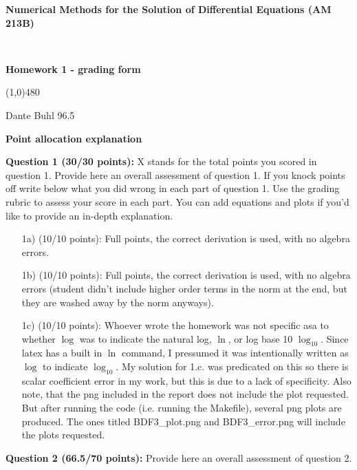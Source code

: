 \documentclass[10pt,english]{article}
\def\vss{\vspace{1cm}}
\def\vs{\vspace{0.2cm}}
\begin{document}
\noindent
\centerline{
\textbf{\large Numerical Methods for the Solution of Differential Equations (AM 213B)}}\\
\centerline{{\bf Homework 1 - grading form}}
%
\centerline{\line(1,0){480}}\vspace{.cm}

\vspace{0.2cm}
 Dante Buhl
\vs
{} 96.5

\vss\noindent
\centerline{\bf Point allocation explanation}


\vs
{\bf Question 1 (30/30 points):} X stands for the total points you scored in question 1. Provide here an overall assessment of question 1.  
%
If you knock points off write below what you did wrong in each part of question 1. Use the grading rubric to assess your score in each part. You can add equations and plots if you'd like to provide an in-depth explanation. 

\begin{enumerate}
\item [1a)] (10/10 points): Full points, the correct derivation is used, with no algebra errors.
\item [1b)] (10/10 points): Full points, the correct derivation is used, with no algebra errors (student didn't include higher order terms in the norm at the end, but they are washed away by the norm anyways). 
\item [1c)] (10/10 points): Whoever wrote the homework was not specific asa to whether $\log$ was to indicate the natural log, $\ln$, or log base 10 $\log_{10}$. Since latex has a built in $\ln$ command, I pressumed it was intentionally written as $\log$ to indicate $\log_{10}$. My solution for 1.c. was predicated on this so there is scalar coefficient error in my work, but this is due to a lack of specificity. Also note, that the png included in the report does not include the plot requested. But after running the code (i.e. running the Makefile), several png plots are produced. The ones titled BDF3\_plot.png and BDF3\_error.png will include the plots requested.
\end{enumerate}


\vs   
{\bf Question 2 (66.5/70 points):} Provide here an overall assessment of question 2.
\end{document}
